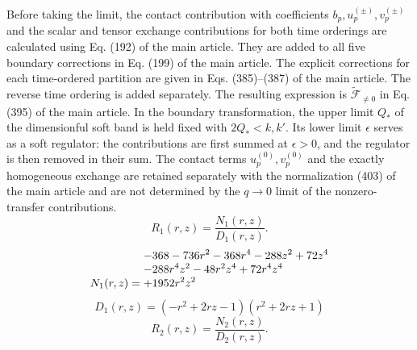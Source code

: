 \documentclass[11pt,a4paper]{article}
\begin{document}
Before taking the limit, the contact contribution with coefficients $ b_p,u_p^{(\pm)},v_p^{(\pm)} $ and the scalar and tensor exchange contributions for both time orderings are calculated using Eq. (192) of the main article. They are added to all five boundary corrections in Eq. (199) of the main article. The explicit corrections for each time-ordered partition are given in Eqs. (385)--(387) of the main article. The reverse time ordering is added separately. The resulting expression is $ \widetilde{\mathcal F}_{\ne0} $ in Eq. (395) of the main article. In the boundary transformation, the upper limit $ Q_* $ of the dimensionful soft band is held fixed with $ 2Q_*<k,k' $. Its lower limit $ \epsilon $ serves as a soft regulator: the contributions are first summed at $ \epsilon>0 $, and the regulator is then removed in their sum. The contact terms $ u_p^{(0)},v_p^{(0)} $ and the exactly homogeneous exchange are retained separately with the normalization (403) of the main article and are not determined by the $ q\to0 $ limit of the nonzero-transfer contributions.
\begin{equation}
R_{1}(r,z)=\frac{N_{1}(r,z)}{D_{1}(r,z)}.
\label{eq:cat-rational-1}
\end{equation}
\begin{equation}
N_{1}(r,z)=\shortstack[l]{$\displaystyle  - 368 - 736 r^{2} - 368 r^{4} - 288 z^{2} + 72 z^{4}$\\
$\displaystyle  - 288 r^{4} z^{2} - 48 r^{2} z^{4} + 72 r^{4} z^{4}$\\
$\displaystyle  + 1952 r^{2} z^{2}$}
\label{eq:cat-numerator-1}
\end{equation}
\begin{equation}
D_{1}(r,z)=\left(- r^{2} + 2 r z - 1\right) \left(r^{2} + 2 r z + 1\right)
\label{eq:cat-denominator-1}
\end{equation}
\begin{equation}
R_{2}(r,z)=\frac{N_{2}(r,z)}{D_{2}(r,z)}.
\label{eq:cat-rational-2}
\end{equation}
\end{document}
